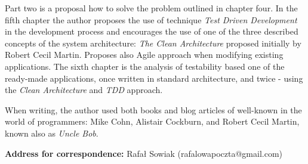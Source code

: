 Part two is a proposal how to solve the problem outlined in chapter four. In the fifth chapter the author proposes the use of technique \textit{Test Driven Development} in the development process and encourages the use of one of the three described concepts of the system architecture: \textit{The Clean Architecture} proposed initially by Robert Cecil Martin. Proposes also Agile approach when modifying existing applications. The sixth chapter is the analysis of testability based one of the ready-made applications, once written in standard architecture, and twice - using the \textit{Clean Architecture} and \textit{TDD} approach.

When writing, the author used both books and blog articles of well-known in the world of programmers: Mike Cohn, Alistair Cockburn, and Robert Cecil Martin, known also as \textit{Uncle Bob}.

\textbf{Address for correspondence:}
Rafał Sowiak (rafalowapoczta@gmail.com)


